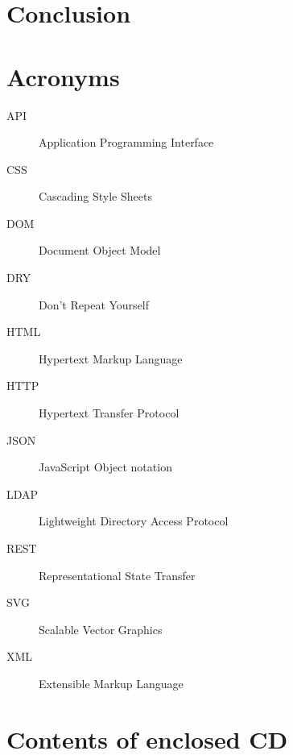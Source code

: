 \documentclass[thesis=M,english,hidelinks]{FITthesis}[2012/10/20]
\begin{document}
\chapter{Conclusion}





\appendix

\chapter{Acronyms}

\begin{description}
  \item[API] Application Programming Interface
  \item[CSS] Cascading Style Sheets
  \item[DOM] Document Object Model
  \item[DRY] Don't Repeat Yourself
  \item[HTML] Hypertext Markup Language
  \item[HTTP] Hypertext Transfer Protocol
  \item[JSON] JavaScript Object notation
  \item[LDAP] Lightweight Directory Access Protocol
  \item[REST] Representational State Transfer
  \item[SVG] Scalable Vector Graphics
  \item[XML] Extensible Markup Language
\end{description}


\chapter{Contents of enclosed CD}

\begin{figure}
\end{figure}
\end{document}
